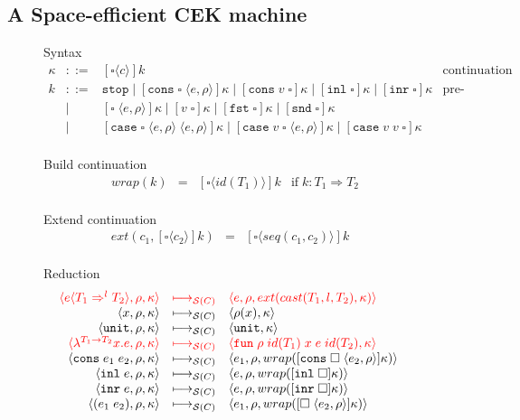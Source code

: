 \documentclass[acmsmall,review,anonymous]{acmart}\settopmatter{printfolios=true,printccs=false,printacmref=false}
\newcommand{\stxrule}[3]{#1 & ::= & #3 & \text{#2}\\}
\newcommand{\stxrulecont}[1]{& | & #1 & \\}
\newcommand{\funrule}[3]{#1 &=& #2 & #3\\}
\newcommand{\sOOinspect}[3]{\langle#1,#2,#3\rangle}
\newcommand{\sOOreturn}[2]{\langle#1,#2\rangle}
\newcommand{\sOOhalt}[1]{\mathtt{Halt} \; #1}
\newcommand{\eOOvar}[1]{#1}
\newcommand{\eOOsole}[0]{\mathtt{unit}}
\newcommand{\eOOlam}[4]{\lambda^{#1\rightarrow{}#2}#3.#4}
\newcommand{\eOOapp}[2]{(#1 \; #2)}
\newcommand{\eOOcons}[2]{\mathtt{cons} \; #1 \; #2}
\newcommand{\eOOinl}[1]{\mathtt{inl} \; #1}
\newcommand{\eOOinr}[1]{\mathtt{inr} \; #1}
\newcommand{\eOOcast}[4]{#1 \langle \cOOcast{#2}{#3}{#4} \rangle}
\newcommand{\cOOcast}[3]{#1 \Rightarrow^{#2} #3}
\newcommand{\rOOsucc}[1]{\mathtt{succ}\;#1}
\newcommand{\rOOfail}[1]{\mathtt{fail}\;#1}
\newcommand{\kOOmt}[0]{\mathtt{stop}}
\newcommand{\kOOconsI}[3]{[\mathtt{cons} \; \square \; \langle#1,#2\rangle ]#3}
\newcommand{\kOOconsII}[2]{[\mathtt{cons} \; #1 \; \square]#2}
\newcommand{\kOOinl}[1]{[\mathtt{inl}\; \square]#1}
\newcommand{\kOOinr}[1]{[\mathtt{inr}\; \square]#1}
\newcommand{\kOOappI}[3]{
  [\square \; \langle#1,#2\rangle]#3
}
\newcommand{\kOOappII}[2]{
  [#1 \; \square]#2}
\newcommand{\kOOcar}[1]{[\mathtt{fst} \; \square]#1}
\newcommand{\kOOcdr}[1]{[\mathtt{snd} \; \square]#1}
\newcommand{\kOOcaseI}[4]{
  [\mathtt{case} \; \square \; \langle#1,#3\rangle \; \langle#2,#3\rangle ]#4}
\newcommand{\kOOcaseII}[4]{
  [\mathtt{case} \; #1 \; \square \; \langle#2,#3\rangle ]#4}
\newcommand{\kOOcaseIII}[3]{
  [\mathtt{case} \; #1 \; #2 \; \square]#3}
\newcommand{\kOOcast}[2]{
  [\square \langle #1 \rangle]#2}
\newcommand{\hcvOOfun}[5]{\mathtt{fun} \; #2 \; #1 \; #3 \; #4 \; #5}
\newcommand{\hcvOOtt}[0]{\mathtt{unit}}
\newcommand{\sidecond}[1]{\text{if}\;#1}
\newcommand{\judgeSreduce}[3]{#2 \longmapsto_{\mathcal{S}(#1)} #3}
\newcommand{\redruleS}[3]{#1 & \longmapsto_{\mathcal{S}(C)} & #2 & #3\\}
\newcommand{\hiredruleS}[3]{\highlight{#1} & 
\highlight{\longmapsto_{\mathcal{S}(C)}} & \highlight{#2} & \highlight{#3} \\}
\newcommand{\ineffCEKD}{$\mathcal{D}$}
\newcommand{\highlight}[1]{{\color{red} #1}}
\begin{document}

\subsection{A Space-efficient CEK machine}
\label{sec:framework:cek}

\begin{figure}
  Syntax
  \[
  \begin{array}{rclr}
  \stxrule{\kappa}{continuation}{
    \kOOcast{c}{k}
  }
  \stxrule{k}{pre-continuations}{
    \kOOmt \mid{}
    \kOOconsI{e}{\rho}{\kappa} \mid
    \kOOconsII{v}{\kappa} \mid
    \kOOinl{\kappa} \mid
    \kOOinr{\kappa}
  }
  \stxrulecont{
    \kOOappI{e}{\rho}{\kappa} \mid
    \kOOappII{v}{\kappa} \mid
    \kOOcar{\kappa} \mid
    \kOOcdr{\kappa}
  }
  \stxrulecont{
    \kOOcaseI{e}{e}{\rho}{\kappa} \mid
    \kOOcaseII{v}{e}{\rho}{\kappa} \mid
    \kOOcaseIII{v}{v}{\kappa}
  }
  \end{array}
  \]
  
  Build continuation 
  \[
  \begin{array}{rclc}
  \funrule{wrap(k)}{\kOOcast{id(T_1)}{k}}{
    \sidecond{k : T_1 \Longrightarrow T_2}}
  \end{array}
  \]
  
  Extend continuation 
  \[
  \begin{array}{rclc}
  \funrule{ext(c_1,\kOOcast{c_2}{k})}{
    \kOOcast{seq(c_1,c_2)}{k}
  }{}
  \end{array}
  \]

  Reduction \fbox{$\judgeSreduce{C}{s}{s}$}
  \[
  \begin{array}{rclr}
  \hiredruleS{
    \sOOinspect{\eOOcast{e}{T_1}{l}{T_2}}{\rho}{\kappa}
  }{
    \sOOinspect{e}{\rho}{ext(cast(T_1,l,T_2),\kappa)}
  }{}
  \redruleS{
    \sOOinspect{\eOOvar{x}}{\rho}{\kappa}
  }{  
    \sOOreturn{\rho(x)}{\kappa}
  }{}
  \redruleS{
    \sOOinspect{\eOOsole}{\rho}{\kappa}
  }{
    \sOOreturn{\hcvOOtt}{\kappa}
  }{}
  \hiredruleS{
    \sOOinspect{\eOOlam{T_1}{T_2}{x}{e}}{\rho}{\kappa}
  }{
    \sOOreturn{\hcvOOfun{id(T_1)}{\rho}{x}{e}{id(T_2)}}{\kappa}
  }{}
  \redruleS{
    \sOOinspect{\eOOcons{e_1}{e_2}}{\rho}{\kappa}
  }{
    \sOOinspect{e_1}{\rho}{
      wrap(\kOOconsI{e_2}{\rho}{\kappa})
    }
  }{}
  \redruleS{
    \sOOinspect{\eOOinl{e}}{\rho}{\kappa}
  }{
    \sOOinspect{e}{\rho}{wrap(\kOOinl{\kappa})}
  }{}
  \redruleS{
    \sOOinspect{\eOOinr{e}}{\rho}{\kappa}
  }{
    \sOOinspect{e}{\rho}{wrap(\kOOinr{\kappa})}
  }{}
  \redruleS{
    \sOOinspect{\eOOapp{e_1}{e_2}}{\rho}{\kappa}
  }{
    \sOOinspect{e_1}{\rho}{wrap(\kOOappI{e_2}{\rho}{\kappa})}}{}
  

\end{array}\]
\end{figure}
\end{document}
